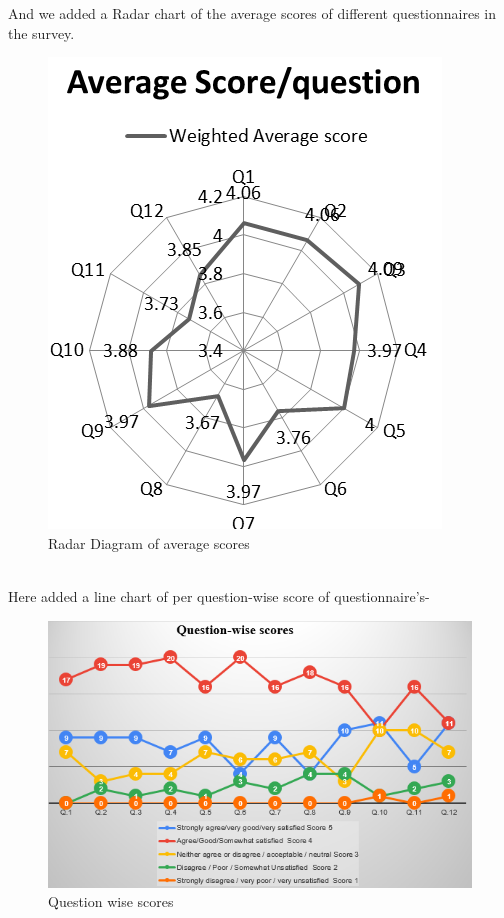 \documentclass[runningheads]{llncs}
\begin{document}
And we added a Radar chart of the average scores of different questionnaires in the survey.
\begin{figure}[h]
\centerline{\includegraphics[width=2.5 in]{average score.png}}
\caption{Radar Diagram of average scores}
\label{fig}
\end{figure}
\vspace{1in}
\\Here added a line chart of per question-wise score of questionnaire's-
\begin{figure}
    \centering
    \includegraphics[width=5 in]{img/rename.png}
    \caption{Question wise scores}
    \label{fig:my_label}
\end{figure}
\end{document}
